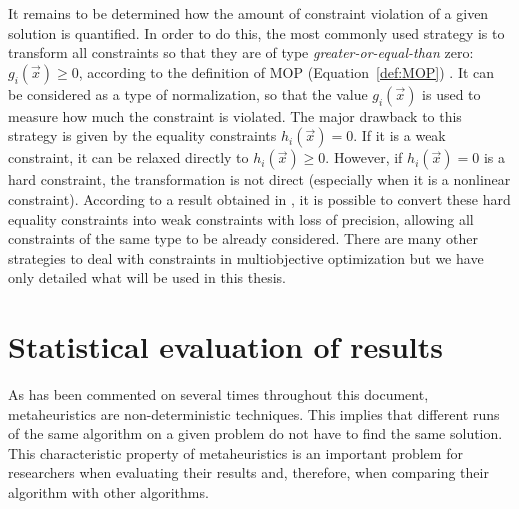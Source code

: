 It remains to be determined how the amount of constraint violation of a given solution is quantified. In order to do this, the most commonly used strategy is to transform all constraints so that they are of type \emph{greater-or-equal-than} zero: $g_i \left (\vec{x}\right) \geq 0$, according to the definition of MOP (Equation~\ref{def:MOP}) \cite{deb01multiobjective}. It can be considered as a type of normalization, so that the value $g_i \left (\vec{x}\right)$ is used to measure how much the constraint is violated. The major drawback to this strategy is given by the equality constraints $h_i\left(\vec{x}\right) = 0$. If it is a weak constraint, it can be relaxed directly to $h_i\left(\vec{x}\right) \geq 0$. However, if $h_i\left(\vec{x}\right) = 0$ is a hard constraint, the transformation is not direct (especially when it is a nonlinear constraint). According to a result obtained in \cite{deb95optimization}, it is possible to convert these hard equality constraints into weak constraints with loss of precision, allowing all constraints of the same type to be already considered. There are many other strategies to deal with constraints in multiobjective optimization \cite{coello07evolutionary, deb01multiobjective} but we have only detailed what will be used in this thesis.

\section{Statistical evaluation of results}
\label{ch.Meta.sec:estadísticas}

As has been commented on several times throughout this document, metaheuristics are non-deterministic techniques. This implies that different runs of the same algorithm on a given problem do not have to find the same solution. This characteristic property of metaheuristics is an important problem for researchers when evaluating their results and, therefore, when comparing their algorithm with other algorithms.

